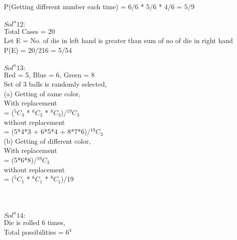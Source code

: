 \documentclass{article}
\begin{document}
P(Getting different number each time) = 6/6 * 5/6 * 4/6 = 5/9 \\
\\

\textbf{$Sol^n 12:$} \\

Total Cases = 20 \\

Let E = No. of die in left hand is greater than sum of no of die in right hand \\

P(E) = 20/216 = 5/54 \\
\\

\textbf{$Sol^n 13:$} \\

Red = 5, Blue = 6, Green = 8 \\

Set of 3 balls is randomly selected, \\

(a) Getting of same color, \\

With replacement \\

= ($^5C_3$ * $^6C_3$ * $^8C_3$)/$^{19}C_3$ \\

without replacement \\

= (5*4*3 + 6*5*4 + 8*7*6)/$^{19}C_3$ \\

(b) Getting of different color, \\

With replacement \\

= (5*6*8)/$^{19}C_3$ \\

without replacement \\

= ($^5C_1$ * $^6C_1$ * $^8C_1$)/19 \\
\\
\\
\\

\textbf{$Sol^n 14:$} \\

Die is rolled 6 times, \\

Total possibilities  = 6$^4$ \\
\end{document}
